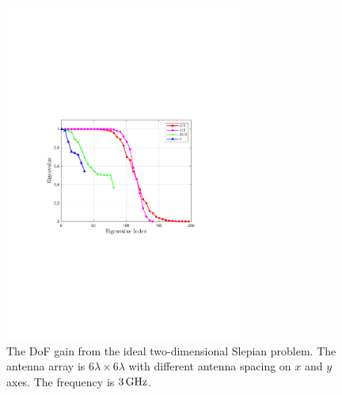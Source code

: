 \documentclass[12pt,draftclsnofoot,journal,onecolumn]{IEEEtran}
\begin{document}
		 \begin{figure}
		 	\centering 
		 	\includegraphics[width=0.7\textwidth]{figs/eigen_two_dimensional.pdf} 
		 	\caption{The DoF gain from the ideal two-dimensional Slepian problem. The antenna array is $6\lambda \times 6\lambda$ with different antenna spacing on $x$ and $y$ axes. The frequency is $3\,{\rm GHz}$.} 
		 	\label{different_z_setting_2d}
		 \end{figure}
		 
\end{document}
